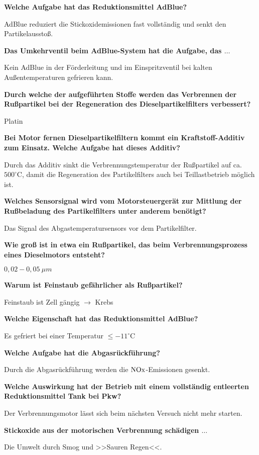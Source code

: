 \textbf{Welche Aufgabe hat das Reduktionsmittel AdBlue?}

AdBlue reduziert die Stickoxidemissionen fast vollständig und senkt den
Partikelausstoß.

\textbf{Das Umkehrventil beim AdBlue-System hat die Aufgabe, das
$\ldots$}

Kein AdBlue in der Förderleitung und im Einspritzventil bei kalten
Außentemperaturen gefrieren kann.

\textbf{Durch welche der aufgeführten Stoffe werden das Verbrennen der
Rußpartikel bei der Regeneration des Dieselpartikelfilters verbessert?}

Platin

\textbf{Bei Motor fernen Dieselpartikelfiltern kommt ein
Kraftstoff-Additiv zum Einsatz. Welche Aufgabe hat dieses Additiv?}

Durch das Additiv sinkt die Verbrennungstemperatur der Rußpartikel auf
ca. $500^\circ\text{C}$, damit die Regeneration des Partikelfilters
auch bei Teillastbetrieb möglich ist.

\textbf{Welches Sensorsignal wird vom Motorsteuergerät zur Mittlung der
Rußbeladung des Partikelfilters unter anderem benötigt?}

Das Signal des Abgastemperatursensors vor dem Partikelfilter.

\textbf{Wie groß ist in etwa ein Rußpartikel, das beim
Verbrennungsprozess eines Dieselmotors entsteht?}

$0,02 - 0,05~\mu m$

\textbf{Warum ist Feinstaub gefährlicher als Rußpartikel?}

Feinstaub ist Zell gängig $\to$ Krebs

\textbf{Welche Eigenschaft hat das Reduktionsmittel AdBlue?}

Es gefriert bei einer Temperatur $\leq -11^\circ\text{C}$

\textbf{Welche Aufgabe hat die Abgasrückführung?}

Durch die Abgasrückführung werden die $\ce{NOx}$-Emissionen gesenkt.

\textbf{Welche Auswirkung hat der Betrieb mit einem vollständig
entleerten Reduktionsmittel Tank bei Pkw?}

Der Verbrennungsmotor lässt sich beim nächsten Versuch nicht mehr
starten.

\textbf{Stickoxide aus der motorischen Verbrennung schädigen $\ldots$}

Die Umwelt durch Smog und >>Sauren Regen<<.

